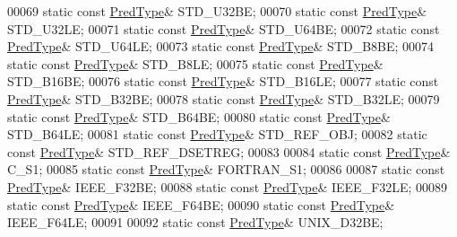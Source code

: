 \begin{DoxyCode}
00069         \textcolor{keyword}{static} \textcolor{keyword}{const} \hyperlink{class_h5_1_1_pred_type}{PredType}& STD\_U32BE;
00070         \textcolor{keyword}{static} \textcolor{keyword}{const} \hyperlink{class_h5_1_1_pred_type}{PredType}& STD\_U32LE;
00071         \textcolor{keyword}{static} \textcolor{keyword}{const} \hyperlink{class_h5_1_1_pred_type}{PredType}& STD\_U64BE;
00072         \textcolor{keyword}{static} \textcolor{keyword}{const} \hyperlink{class_h5_1_1_pred_type}{PredType}& STD\_U64LE;
00073         \textcolor{keyword}{static} \textcolor{keyword}{const} \hyperlink{class_h5_1_1_pred_type}{PredType}& STD\_B8BE;
00074         \textcolor{keyword}{static} \textcolor{keyword}{const} \hyperlink{class_h5_1_1_pred_type}{PredType}& STD\_B8LE;
00075         \textcolor{keyword}{static} \textcolor{keyword}{const} \hyperlink{class_h5_1_1_pred_type}{PredType}& STD\_B16BE;
00076         \textcolor{keyword}{static} \textcolor{keyword}{const} \hyperlink{class_h5_1_1_pred_type}{PredType}& STD\_B16LE;
00077         \textcolor{keyword}{static} \textcolor{keyword}{const} \hyperlink{class_h5_1_1_pred_type}{PredType}& STD\_B32BE;
00078         \textcolor{keyword}{static} \textcolor{keyword}{const} \hyperlink{class_h5_1_1_pred_type}{PredType}& STD\_B32LE;
00079         \textcolor{keyword}{static} \textcolor{keyword}{const} \hyperlink{class_h5_1_1_pred_type}{PredType}& STD\_B64BE;
00080         \textcolor{keyword}{static} \textcolor{keyword}{const} \hyperlink{class_h5_1_1_pred_type}{PredType}& STD\_B64LE;
00081         \textcolor{keyword}{static} \textcolor{keyword}{const} \hyperlink{class_h5_1_1_pred_type}{PredType}& STD\_REF\_OBJ;
00082         \textcolor{keyword}{static} \textcolor{keyword}{const} \hyperlink{class_h5_1_1_pred_type}{PredType}& STD\_REF\_DSETREG;
00083 
00084         \textcolor{keyword}{static} \textcolor{keyword}{const} \hyperlink{class_h5_1_1_pred_type}{PredType}& C\_S1;
00085         \textcolor{keyword}{static} \textcolor{keyword}{const} \hyperlink{class_h5_1_1_pred_type}{PredType}& FORTRAN\_S1;
00086 
00087         \textcolor{keyword}{static} \textcolor{keyword}{const} \hyperlink{class_h5_1_1_pred_type}{PredType}& IEEE\_F32BE;
00088         \textcolor{keyword}{static} \textcolor{keyword}{const} \hyperlink{class_h5_1_1_pred_type}{PredType}& IEEE\_F32LE;
00089         \textcolor{keyword}{static} \textcolor{keyword}{const} \hyperlink{class_h5_1_1_pred_type}{PredType}& IEEE\_F64BE;
00090         \textcolor{keyword}{static} \textcolor{keyword}{const} \hyperlink{class_h5_1_1_pred_type}{PredType}& IEEE\_F64LE;
00091 
00092         \textcolor{keyword}{static} \textcolor{keyword}{const} \hyperlink{class_h5_1_1_pred_type}{PredType}& UNIX\_D32BE;

\end{DoxyCode}
